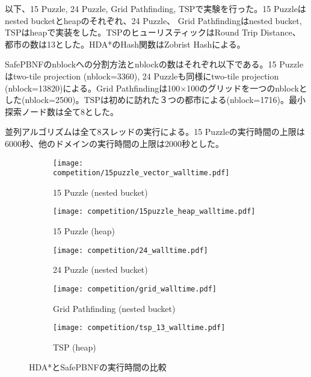 \documentclass[uplatex]{jsarticle}
\begin{document}
以下、15 Puzzle, 24 Puzzle, Grid Pathfinding, TSPで実験を行った。15 Puzzleはnested bucketとheapのそれぞれ、24 Puzzle、 Grid Pathfindingはnested bucket, TSPはheapで実装をした。TSPのヒューリスティックはRound Trip Distance、都市の数は13とした。HDA*のHash関数はZobrist Hashによる。

SafePBNFのnblockへの分割方法とnblockの数はそれぞれ以下である。15 Puzzleはtwo-tile projection (nblock=3360), 24 Puzzleも同様にtwo-tile projection (nblock=13820)による。Grid Pathfindingは100$\times$100のグリッドを一つのnblockとした(nblock=2500)。TSPは初めに訪れた３つの都市による(nblock=1716)。最小探索ノード数は全て8とした。

並列アルゴリズムは全て8スレッドの実行による。15 Puzzleの実行時間の上限は6000秒、他のドメインの実行時間の上限は2000秒とした。
\newline

\begin{figure}[h]
	\centering
	\begin{subfigure}{0.4\columnwidth}
		\texttt{[image: competition/15puzzle\_vector\_walltime.pdf]}
		\caption{15 Puzzle (nested bucket)}
		\label{fig:15puzzle_vector}
	\end{subfigure}
	\begin{subfigure}{0.4\columnwidth}
		\texttt{[image: competition/15puzzle\_heap\_walltime.pdf]}
		\caption{15 Puzzle (heap)}
		\label{fig:15puzzle_heap}
	\end{subfigure}
	\begin{subfigure}{0.4\columnwidth}
		\texttt{[image: competition/24\_walltime.pdf]}
		\caption{24 Puzzle (nested bucket)}
		\label{fig:24puzzle_vector}
	\end{subfigure}
	\begin{subfigure}{0.4\columnwidth}
		\texttt{[image: competition/grid\_walltime.pdf]}
		\caption{Grid Pathfinding (nested bucket)}
		\label{fig:grid}
	\end{subfigure}
	\begin{subfigure}{0.4\columnwidth}
		\texttt{[image: competition/tsp\_13\_walltime.pdf]}
		\caption{TSP (heap)} %
		\label{fig:tsp_13}
	\end{subfigure}
	\caption{HDA*とSafePBNFの実行時間の比較}
	\label{fig:comparison}
\end{figure}
\end{document}
